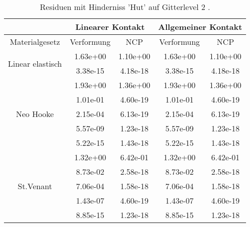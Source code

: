 \begin{table} 
\centering 
\begin{tabular}{c|cc|cc|} 
\cline{2-5} 
 & \multicolumn{2}{|c|}{Linearer Kontakt} & \multicolumn{2}{|c|}{Allgemeiner Kontakt} \\ 
\hline 
\multicolumn{1}{|c|}{Materialgesetz} & \multicolumn{1}{c|}{Verformung} & \multicolumn{1}{c|}{NCP} & \multicolumn{1}{c|}{Verformung} & \multicolumn{1}{c|}{NCP} \\ 
\hline 
\multicolumn{1}{|c|}{\multirow{2}{*}{Linear elastisch}} &\multicolumn{1}{|c|}{  1.63e+00} & \multicolumn{1}{|c|}{  1.10e+00} & \multicolumn{1}{|c|}{  1.63e+00} & \multicolumn{1}{|c|}{  1.10e+00} \\ 
\multicolumn{1}{|c|}{} & \multicolumn{1}{|c|}{  3.38e-15} & \multicolumn{1}{|c|}{  4.18e-18} & \multicolumn{1}{|c|}{  3.38e-15} & \multicolumn{1}{|c|}{  4.18e-18} \\ 
\hline 
\multicolumn{1}{|c|}{\multirow{5}{*}{Neo Hooke}} &\multicolumn{1}{|c|}{  1.93e+00} & \multicolumn{1}{|c|}{  1.36e+00} & \multicolumn{1}{|c|}{  1.93e+00} & \multicolumn{1}{|c|}{  1.36e+00} \\ 
\multicolumn{1}{|c|}{} & \multicolumn{1}{|c|}{  1.01e-01} & \multicolumn{1}{|c|}{  4.60e-19} & \multicolumn{1}{|c|}{  1.01e-01} & \multicolumn{1}{|c|}{  4.60e-19} \\ 
\multicolumn{1}{|c|}{} & \multicolumn{1}{|c|}{  2.15e-04} & \multicolumn{1}{|c|}{  6.13e-19} & \multicolumn{1}{|c|}{  2.15e-04} & \multicolumn{1}{|c|}{  6.13e-19} \\ 
\multicolumn{1}{|c|}{} & \multicolumn{1}{|c|}{  5.57e-09} & \multicolumn{1}{|c|}{  1.23e-18} & \multicolumn{1}{|c|}{  5.57e-09} & \multicolumn{1}{|c|}{  1.23e-18} \\ 
\multicolumn{1}{|c|}{} & \multicolumn{1}{|c|}{  5.22e-15} & \multicolumn{1}{|c|}{  1.43e-18} & \multicolumn{1}{|c|}{  5.22e-15} & \multicolumn{1}{|c|}{  1.43e-18} \\ 
\hline 
\multicolumn{1}{|c|}{\multirow{5}{*}{St.Venant}} &\multicolumn{1}{|c|}{  1.32e+00} & \multicolumn{1}{|c|}{  6.42e-01} & \multicolumn{1}{|c|}{  1.32e+00} & \multicolumn{1}{|c|}{  6.42e-01} \\ 
\multicolumn{1}{|c|}{} & \multicolumn{1}{|c|}{  8.73e-02} & \multicolumn{1}{|c|}{  2.58e-18} & \multicolumn{1}{|c|}{  8.73e-02} & \multicolumn{1}{|c|}{  2.58e-18} \\ 
\multicolumn{1}{|c|}{} & \multicolumn{1}{|c|}{  7.06e-04} & \multicolumn{1}{|c|}{  1.58e-18} & \multicolumn{1}{|c|}{  7.06e-04} & \multicolumn{1}{|c|}{  1.58e-18} \\ 
\multicolumn{1}{|c|}{} & \multicolumn{1}{|c|}{  1.43e-07} & \multicolumn{1}{|c|}{  4.60e-19} & \multicolumn{1}{|c|}{  1.43e-07} & \multicolumn{1}{|c|}{  4.60e-19} \\ 
\multicolumn{1}{|c|}{} & \multicolumn{1}{|c|}{  8.85e-15} & \multicolumn{1}{|c|}{  1.23e-18} & \multicolumn{1}{|c|}{  8.85e-15} & \multicolumn{1}{|c|}{  1.23e-18} \\ 
\hline 
\end{tabular}\caption{Residuen mit Hinderniss 'Hut' auf Gitterlevel 2 .}\label{tab:Residuum_Hut_level2}
\end{table} 
